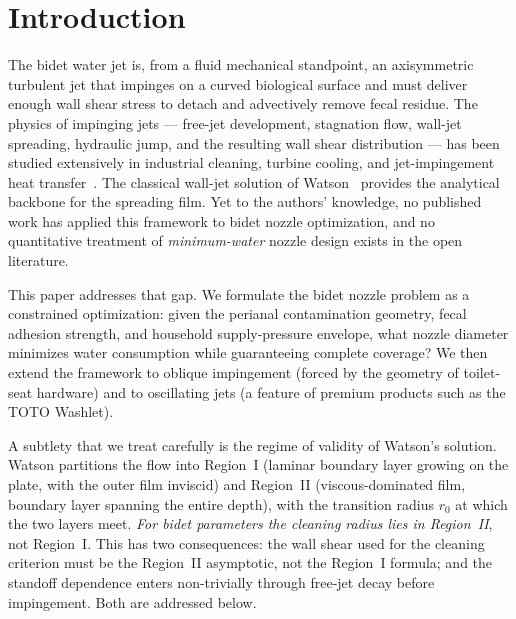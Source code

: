\documentclass[aps,prfluids,reprint,amsmath,amssymb,floatfix]{revtex4-2}
\begin{document}
\maketitle

\section{Introduction}
\label{sec:intro}

The bidet water jet is, from a fluid mechanical standpoint, an axisymmetric
turbulent jet that impinges on a curved biological surface and must
deliver enough wall shear stress to detach and advectively remove fecal
residue. The physics of impinging jets --- free-jet development, stagnation
flow, wall-jet spreading, hydraulic jump, and the resulting wall shear
distribution --- has been studied extensively in industrial cleaning,
turbine cooling, and jet-impingement heat transfer~\citep{ZuckermanLior2006}.
The classical wall-jet solution of Watson~\citep{Watson1964} provides the
analytical backbone for the spreading film. Yet to the authors' knowledge,
no published work has applied this framework to bidet nozzle optimization,
and no quantitative treatment of \emph{minimum-water} nozzle design exists
in the open literature.

This paper addresses that gap. We formulate the bidet nozzle problem as a
constrained optimization: given the perianal contamination geometry, fecal
adhesion strength, and household supply-pressure envelope, what nozzle
diameter minimizes water consumption while guaranteeing complete coverage?
We then extend the framework to oblique impingement (forced by the
geometry of toilet-seat hardware) and to oscillating jets (a feature of
premium products such as the TOTO Washlet).

A subtlety that we treat carefully is the regime of validity of Watson's
solution. Watson partitions the flow into Region~I (laminar boundary
layer growing on the plate, with the outer film inviscid) and Region~II
(viscous-dominated film, boundary layer spanning the entire depth), with
the transition radius $r_0$ at which the two layers meet. \emph{For
bidet parameters the cleaning radius lies in Region~II}, not Region~I.
This has two consequences: the wall shear used for the cleaning criterion
must be the Region~II asymptotic, not the Region~I formula; and the
standoff dependence enters non-trivially through free-jet decay before
impingement. Both are addressed below.
\end{document}
